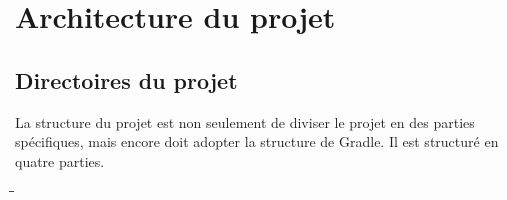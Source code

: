 \documentclass[12pt, pdflatex]{article}
\begin{document}
\pagebreak

\section{Architecture du projet}
    \subsection{Directoires du projet}
    La structure du projet est non seulement de diviser le projet en des parties spécifiques, mais encore doit adopter la structure de Gradle. Il est structuré en quatre parties.

    \begin{minipage}{\textwidth}
        \begin{tabbing}
        \hspace{1em}\=\hspace{1em}\=\hspace{1em}\=\hspace{12em}\=\\\kill
         \>\>\>\> \\

         \>\>\>\> \\

         \>\>\>\> \\
        
         \>\>\>\> \+\\
           \>\>\>   \+\\
             \>\> \\
             \>\> \-\\

           \>\>\>  \+\\
             \>\>  \-\\

           \>\>\>  \+\\
             \>\> \\
             \>\>  \\
             \>\>  \\
             \>\>  \-\\

           \>\>\>  \+\\
             \>\> \-\\

           \>\>\>  \\

        \end{tabbing}
        \end{minipage}
\end{document}
